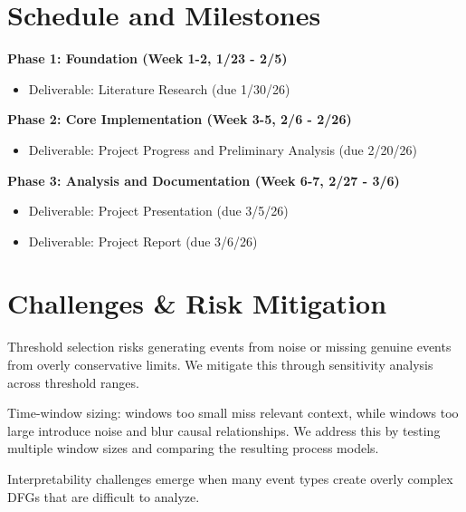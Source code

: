 \documentclass[14pt]{extarticle}
\begin{document}
\section{Schedule and Milestones}

\textbf{Phase 1: Foundation (Week 1-2, 1/23 - 2/5)}
\begin{itemize}
    \item Deliverable: Literature Research (due 1/30/26)
\end{itemize}

\textbf{Phase 2: Core Implementation (Week 3-5, 2/6 - 2/26)}
\begin{itemize}
    \item Deliverable: Project Progress and Preliminary Analysis (due 2/20/26)
\end{itemize}

\textbf{Phase 3: Analysis and Documentation (Week 6-7, 2/27 - 3/6)}
\begin{itemize}
    \item Deliverable: Project Presentation (due 3/5/26)
    \item Deliverable: Project Report (due 3/6/26)
\end{itemize}

\section{Challenges \& Risk Mitigation}

Threshold selection risks generating events from noise or missing genuine events from overly conservative limits. We mitigate this through sensitivity analysis across threshold ranges.

Time-window sizing: windows too small miss relevant context, while windows too large introduce noise and blur causal relationships. We address this by testing multiple window sizes and comparing the resulting process models.

Interpretability challenges emerge when many event types create overly complex DFGs that are difficult to analyze.
\end{document}
